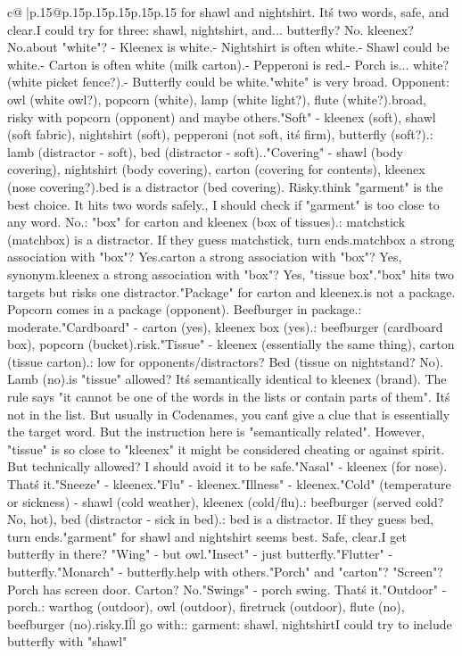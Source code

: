 \documentclass{article}
\begin{document}
{\begin{supertabular}{c@{$\;$}|p{.15\linewidth}@{}p{.15\linewidth}p{.15\linewidth}p{.15\linewidth}p{.15\linewidth}p{.15\linewidth}}
{{{for shawl and nightshirt. It\'s two words, safe, and clear.\n\nOr I could try for three: shawl, nightshirt, and... butterfly? No. kleenex? No.\n\nWhat about "white"? \n- Kleenex is white.\n- Nightshirt is often white.\n- Shawl could be white.\n- Carton is often white (milk carton).\n- Pepperoni is red.\n- Porch is... white? (white picket fence?).\n- Butterfly could be white.\nBut "white" is very broad. Opponent: owl (white owl?), popcorn (white), lamp (white light?), flute (white?).\nToo broad, risky with popcorn (opponent) and maybe others.\n\n"Soft" - kleenex (soft), shawl (soft fabric), nightshirt (soft), pepperoni (not soft, it\'s firm), butterfly (soft?).\nOpponent: lamb (distractor - soft), bed (distractor - soft).\nBad.\n\n"Covering" - shawl (body covering), nightshirt (body covering), carton (covering for contents), kleenex (nose covering?).\nBut bed is a distractor (bed covering). Risky.\n\nI think "garment" is the best choice. It hits two words safely.\n\nWait, I should check if "garment" is too close to any word. No.\n\nAlternative: "box" for carton and kleenex (box of tissues).\nRisk: matchstick (matchbox) is a distractor. If they guess matchstick, turn ends.\nIs matchbox a strong association with "box"? Yes.\nIs carton a strong association with "box"? Yes, synonym.\nIs kleenex a strong association with "box"? Yes, "tissue box".\nSo "box" hits two targets but risks one distractor.\n\n"Package" for carton and kleenex.\nMatchstick is not a package. Popcorn comes in a package (opponent). Beefburger in package.\nRisk: moderate.\n\n"Cardboard" - carton (yes), kleenex box (yes).\nRisk: beefburger (cardboard box), popcorn (bucket).\nHigh risk.\n\n"Tissue" - kleenex (essentially the same thing), carton (tissue carton).\nRisk: low for opponents/distractors? Bed (tissue on nightstand? No). Lamb (no).\nBut is "tissue" allowed? It\'s semantically identical to kleenex (brand). The rule says "it cannot be one of the words in the lists or contain parts of them". It\'s not in the list. But usually in Codenames, you can\'t give a clue that is essentially the target word. But the instruction here is "semantically related". However, "tissue" is so close to "kleenex" it might be considered cheating or against spirit. But technically allowed? I should avoid it to be safe.\n\n"Nasal" - kleenex (for nose). That\'s it.\n\n"Sneeze" - kleenex.\n\n"Flu" - kleenex.\n\n"Illness" - kleenex.\n\n"Cold" (temperature or sickness) - shawl (cold weather), kleenex (cold/flu).\nRisk: beefburger (served cold? No, hot), bed (distractor - sick in bed).\nRisk: bed is a distractor. If they guess bed, turn ends.\n\nSo "garment" for shawl and nightshirt seems best. Safe, clear.\n\nCould I get butterfly in there? "Wing" - but owl.\n"Insect" - just butterfly.\n"Flutter" - butterfly.\n"Monarch" - butterfly.\nNone help with others.\n\n"Porch" and "carton"? "Screen"? Porch has screen door. Carton? No.\n\n"Swings" - porch swing. That\'s it.\n\n"Outdoor" - porch.\nOpponent: warthog (outdoor), owl (outdoor), firetruck (outdoor), flute (no), beefburger (no).\nToo risky.\n\nSo I\'ll go with:\nCLUE: garment\nTARGETS: shawl, nightshirt\n\nOr I could try to include butterfly with "shawl" }}}
\end{supertabular}}
\end{document}

